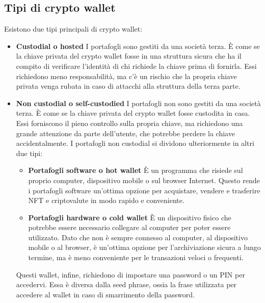 \documentclass[12pt]{report}
\begin{document}
\subsection{Tipi di crypto wallet}
Esistono due tipi principali di crypto wallet:
\begin{itemize}[topsep=5pt, itemsep=0pt]
    \item \textbf{Custodial o hosted}\newline
    I portafogli sono gestiti da una società terza. È come se la chiave privata del crypto wallet fosse in una struttura sicura che ha il compito di verificare l'identità di chi richiede la chiave prima di fornirla.\newline
    Essi richiedono meno responsabilità, ma c'è un rischio che la propria chiave privata venga rubata in caso di attacchi alla struttura della terza parte.
    \item \textbf{Non custodial o self-custodied}\newline
    I portafogli non sono gestiti da una società terza. È come se la chiave privata del crypto wallet fosse custodita in casa.\newline
    Essi forniscono il pieno controllo sulla propria chiave, ma richiedono una grande attenzione da parte dell'utente, che potrebbe perdere la chiave accidentalmente.\newline
    I portafogli non custodial si dividono ulteriormente in altri due tipi:
    \begin{itemize}[topsep=-2pt, itemsep=0pt, label={$-$}]
        \item \textbf{Portafogli software o hot wallet}\newline
        È un programma che risiede sul proprio computer, dispositivo mobile o sul browser Internet.\newline
        Questo rende i portafogli software un'ottima opzione per acquistare, vendere e trasferire NFT e criptovalute in modo rapido e conveniente.
        \item \textbf{Portafogli hardware o cold wallet}\newline
        È un dispositivo fisico che potrebbe essere necessario collegare al computer per poter essere utilizzato.\newline
        Dato che non è sempre connesso al computer, al dispositivo mobile o al browser, è un'ottima opzione per l'archiviazione sicura a lungo termine, ma è meno conveniente per le transazioni veloci o frequenti.
    \end{itemize}
    Questi wallet, infine, richiedono di impostare una password o un PIN per accedervi. Essa è diversa dalla seed phrase, ossia la frase utilizzata per accedere al wallet in caso di smarrimento della password. \cite{Otto}
\end{itemize}
\end{document}
